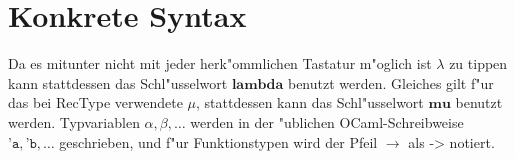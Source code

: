 \section{Konkrete Syntax}

Da es mitunter nicht mit jeder herk"ommlichen Tastatur m"oglich ist $\lambda$ zu tippen kann stattdessen das
Schl"usselwort $\textbf{lambda}$ benutzt werden. Gleiches gilt f"ur das bei RecType verwendete $\mu$, 
stattdessen kann das Schl"usselwort $\textbf{mu}$ benutzt werden.
Typvariablen $\alpha,\beta,\ldots$ werden in der "ublichen OCaml-Schreibweise $\texttt{'a},
\texttt{'b},\ldots$ geschrieben, und f"ur Funktionstypen wird der Pfeil
$\to$ als $\texttt{->}$ notiert.



